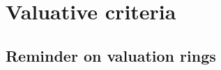 \section{Valuative criteria}
\label{section:2.7}


\subsection{Reminder on valuation rings}
\label{subsection:2.7.1}






